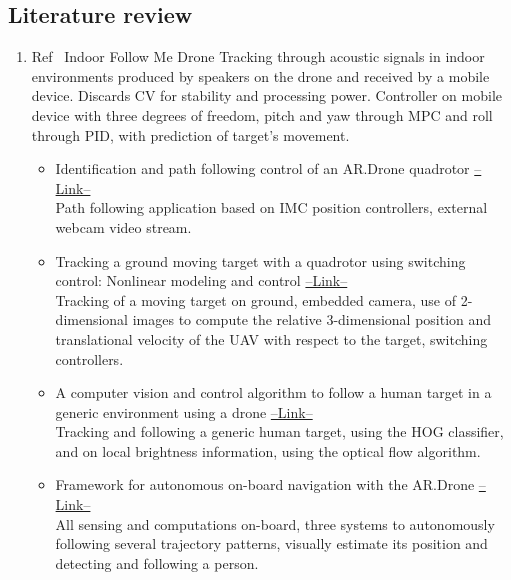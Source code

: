 \subsection{Literature review}
\begin{enumerate}

\item Ref~\cite{Mao2017345} Indoor Follow Me Drone
Tracking through acoustic signals in indoor environments produced by speakers on the drone and received by a mobile device. Discards CV for stability and processing power. Controller on mobile device with three degrees of freedom, pitch and yaw through MPC and roll through PID, with prediction of target's movement.
\begin{itemize}
\item Identification and path following control of an AR.Drone quadrotor \href{https://www.scopus.com/record/display.uri?eid=2-s2.0-84893212045&origin=reflist}{--Link--} \\ 
Path following application based on IMC position controllers, external webcam video stream.

\item Tracking a ground moving target with a quadrotor using switching control: Nonlinear modeling and control \href{https://www.scopus.com/record/display.uri?eid=2-s2.0-84871633622&origin=reflist}{--Link--} \\ 
Tracking of a moving target on ground, embedded camera, use of 2-dimensional images to compute the relative 3-dimensional position and translational velocity of the UAV with respect to the target, switching controllers.

\item A computer vision and control algorithm to follow a human target in a generic environment using a drone \href{https://www.scopus.com/record/display.uri?eid=2-s2.0-84978870802&origin=reflist}{--Link--} \\ 
Tracking and following a generic human target, using the HOG classifier, and on local brightness information, using the optical flow algorithm.

\item Framework for autonomous on-board navigation with the AR.Drone \href{https://www.scopus.com/record/display.uri?eid=2-s2.0-84899426060&origin=reflist}{--Link--} \\ 
All sensing and computations on-board, three systems to autonomously following several trajectory patterns, visually estimate its position and detecting and following a person.


\end{itemize}
\end{enumerate}
